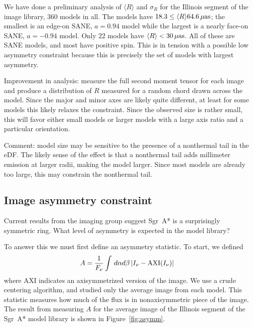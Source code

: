 \documentclass[twocolumn,tighten,dvipsnames]{aastex63}
\newcommand\sgra{Sgr~A*\xspace}
\newcommand\uas{{\rm \, \mu as}}
\newcommand\<{{\langle}}
\renewcommand\>{{\rangle}} %
\begin{document}
We have done a preliminary analysis of $\langle R \rangle$ and $\sigma_R$ for the Illinois segment of the image library, 360 models in all.  The models have  $18.3 \le \langle R \rangle 64.6 \uas$; the smallest is an edge-on SANE, $a = 0.94$ model while the largest is a nearly face-on SANE, $a = -0.94$ model.  Only 22 models have $\langle R \rangle < 30\uas$.  All of these are SANE models, and most have positive spin.  This is in tension with a possible low  asymmetry constraint because this is precisely the set of models with largest asymmetry.

Improvement in analysis: measure the full second moment tensor for each image and produce a distribution of $R$ measured for a random chord drawn across the model.  Since the major and minor axes are likely quite different, at least for some models \citep{2019ApJ...871...30I} this likely relaxes the constraint.  Since the observed size is rather small, this will favor either small models or larger models with a large axis ratio and a particular orientation.

Comment: model size may be sensitive to the presence of a nonthermal tail in the eDF.  The likely sense of the effect is that a nonthermal tail adds millimeter emission at larger radii, making the model larger.  Since most models are already too large, this may constrain the nonthermal tail.

\subsection{Image asymmetry constraint}
\label{sec:asymconst}

Current results from the imaging group suggest \sgra is a surprisingly symmetric ring.   What level of asymmetry is expected in the model library?

To answer this we must first define an asymmetry statistic.  To start, we defined
\begin{equation}
  A = \frac{1}{F_\nu} \int \, d\alpha d\beta \, | I_\nu - {\rm AXI}(I_\nu) |
\end{equation}
where AXI indicates an axisymmetrized version of the image.  We use a crude centering algorithm, and studied only the average image from each model.  This statistic measures how much of the flux is in nonaxisymmetric piece of the image.   The result from measuring $A$ for the average image of the Illinois segment of the \sgra model library is shown in Figure~\ref{fig:asymm}.
\end{document}
